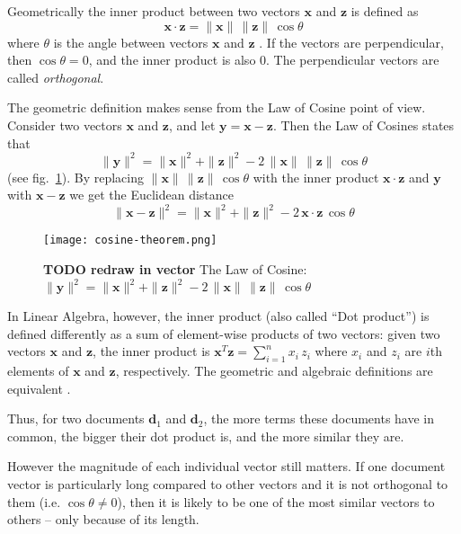 Geometrically the inner product between two vectors $\mathbf x$ and $\mathbf z$
is defined as
$$\mathbf x \cdot \mathbf z = \|\mathbf x \| \, \| \mathbf z \| \, \cos \theta$$
where $\theta$ is the angle between vectors $\mathbf x$ and $\mathbf z$ \cite{huges2013calculus}.
If the vectors are perpendicular, then $\cos \theta = 0$,
and the inner product is also $0$. The perpendicular vectors are called \emph{orthogonal}.

The geometric definition makes sense from the Law of Cosine point of view.
Consider two vectors $\mathbf x$ and $\mathbf z$, and let
$\mathbf y = \mathbf x - \mathbf z$.
Then the Law of Cosines states that
$$\| \mathbf y \|^2 = \| \mathbf x \|^2 + \| \mathbf z \|^2 - 2 \, \| \mathbf x \| \, \| \mathbf z\| \, \cos \theta$$
(see fig.~\ref{fig:law-cosines}).
By replacing $\| \mathbf x \| \, \| \mathbf z\| \, \cos \theta$ with
the inner product $\mathbf x \cdot \mathbf z$ and $\mathbf y$ with $\mathbf x - \mathbf z$
we get the Euclidean distance
$$\| \mathbf x - \mathbf z \|^2 = \| \mathbf x \|^2 + \| \mathbf z \|^2 - 2 \, \mathbf x \cdot \mathbf z \, \cos \theta$$


\begin{figure}[h]
\centering\texttt{[image: cosine-theorem.png]}
\caption{\textbf{TODO redraw in vector} The Law of Cosine:
$\| \mathbf y \|^2 = \| \mathbf x \|^2 + \| \mathbf z \|^2 - 2 \, \| \mathbf x \| \, \| \mathbf z\| \, \cos \theta$}
\label{fig:law-cosines}
\end{figure}


In Linear Algebra, however, the inner product (also called ``Dot product'')
is defined differently as a sum of element-wise products of two vectors:
given two vectors $\mathbf x$ and $\mathbf z$, the inner product is
$\mathbf x^T \mathbf z = \sum_{i = 1}^n x_i \, z_i$ where $x_i$ and $z_i$
are $i$th elements of $\mathbf x$ and $\mathbf z$, respectively.
The geometric and algebraic definitions are equivalent \cite{huges2013calculus}.


Thus, for two documents $\mathbf d_1$ and $\mathbf d_2$, the more terms
these documents have in common, the bigger their dot product is, and
the more similar they are.

However the magnitude of each individual vector still matters. If one
document vector is particularly long compared to other vectors and it is not
orthogonal to them (i.e. $\cos \theta \ne 0$), then it is likely to be
one of the most similar vectors to others -- only because of its length.


